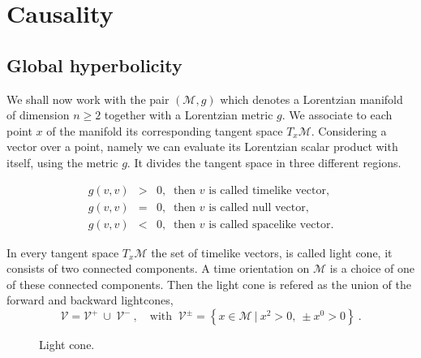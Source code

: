 \documentclass[11pt]{book}
\newcommand{\Mcal}{\mathcal{M}}
\newcommand{\Vcal}{\mathcal{V}}
\theoremstyle{break}
\begin{document}
\section{Causality}


\subsection{Global hyperbolicity}
\label{p:GLOB_HYPERBOL}


We shall now work with the pair $(\Mcal,g)$ which denotes a Lorentzian manifold of dimension $n \geq 2$ together with a Lorentzian metric $g$. We associate to each point $x$ of the manifold its corresponding tangent space $T_x\Mcal$. Considering a vector over a point, namely we can evaluate its Lorentzian scalar product with itself, using the metric $g$. It divides the tangent space in three different regions.


\begin{eqnarray*}
g(v,v) &>& 0 , \ \mbox{ then $v$ is called timelike vector}, \\ 
g(v,v) &=& 0 , \ \mbox{ then $v$ is called null vector}, \\ 
g(v,v) &<& 0 , \ \mbox{ then $v$ is called spacelike vector}.
\end{eqnarray*}


In every tangent space $T_x\Mcal$ the set of timelike vectors, is called light cone, it consists of two connected components. A time orientation on $\Mcal$ is a choice of one of these connected components. Then the light cone is refered as the union of the forward and backward lightcones, 
%
\begin{equation*}
\Vcal=\Vcal^{+} \ \cup \ \Vcal^{-} \ , \quad \mbox{with } \ \Vcal^{\pm}=\left\{ x\in\Mcal \ | \ x^{2}>0, \ \pm x^{0}>0 \right\} \ . 
\end{equation*}


\begin{figure}[ht!]
%
\begin{center}
%
%
\end{center}
%
\caption{Light cone.}
%
\end{figure}
\end{document}
